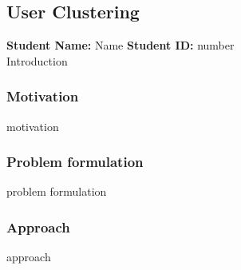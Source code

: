 \subsection{User Clustering}
\textbf{Student Name: }Name \textbf{Student ID:} number\\
Introduction
\subsubsection*{Motivation}
motivation
\subsubsection*{Problem formulation}
problem formulation
\subsubsection*{Approach}
approach
